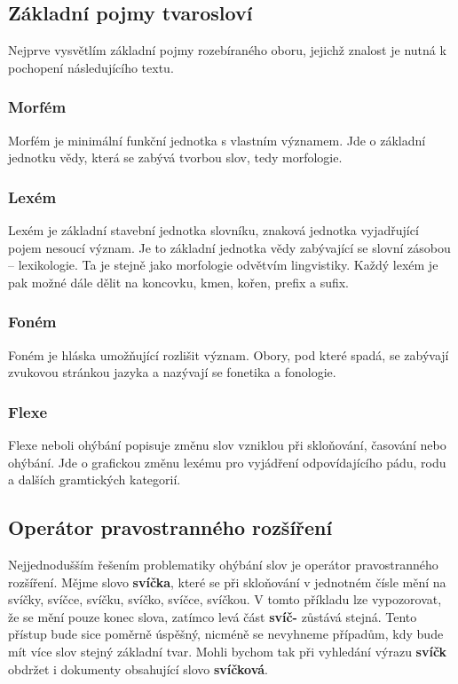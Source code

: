 \documentclass[FM,DP]{tulthesis}
\begin{document}
\subsection{Základní pojmy tvarosloví}

Nejprve vysvětlím základní pojmy rozebíraného oboru, jejichž znalost je nutná k pochopení 
následujícího textu.

\subsubsection*{Morfém}

Morfém je minimální funkční jednotka s vlastním významem. Jde o základní jednotku vědy, 
která se zabývá tvorbou slov, tedy morfologie.

\subsubsection*{Lexém}

Lexém je základní stavební jednotka slovníku, znaková jednotka vyjadřující pojem nesoucí
význam. Je to základní jednotka vědy zabývající se slovní zásobou -- lexikologie. Ta je stejně 
jako morfologie odvětvím lingvistiky. Každý lexém je pak možné dále dělit na koncovku, 
kmen, kořen, prefix a sufix.

\subsubsection*{Foném}

Foném je hláska umožňující rozlišit význam. Obory, pod které spadá, se zabývají zvukovou
stránkou jazyka a nazývají se fonetika a fonologie.

\subsubsection*{Flexe}

Flexe neboli ohýbání popisuje změnu slov vzniklou při skloňování, časování nebo ohýbání.
Jde o grafickou změnu lexému pro vyjádření odpovídajícího pádu, rodu a dalších gramtických
kategorií.

\subsection{Operátor pravostranného rozšíření}

Nejjednodušším řešením problematiky ohýbání slov je operátor pravostranného rozšíření.
Mějme slovo \textbf{svíčka}, které se při skloňování v jednotném čísle mění na svíčky, svíčce, 
svíčku, svíčko, svíčce, svíčkou. V tomto příkladu lze vypozorovat, že se mění
pouze konec slova, zatímco levá část \textbf{svíč-} zůstává stejná. Tento přístup bude 
sice poměrně úspěšný, nicméně se nevyhneme případům, kdy bude mít více slov stejný
základní tvar. Mohli bychom tak při vyhledání výrazu \textbf{svíčk} obdržet i dokumenty
obsahující slovo \textbf{svíčková}.
\end{document}
